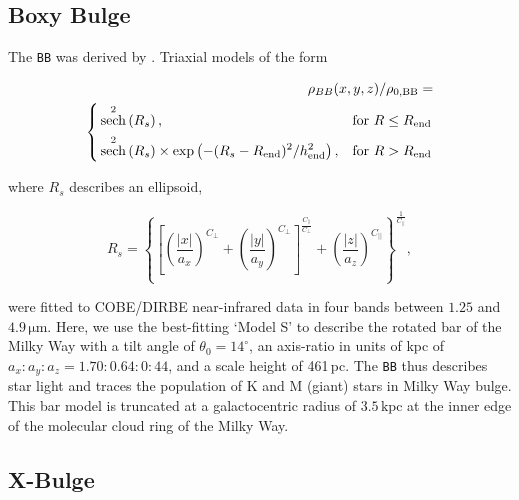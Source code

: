 \documentclass[doublespace,draft,nopageskip]{VTthesis} %
\newcommand{\mrm}[1]{\mathrm{#1}}
\DeclareMathOperator\sech{sech}
\begin{document}
\begin{appendices}
	
	\subsection{Boxy Bulge}
	
	The \texttt{BB} was derived by \citet{Freudenreich1998_BoxyBulge_COBE}.
	Triaxial models of the form
	
	\begin{eqnarray}
		\rho_{BB}(x,y,z)/\rho_{0,\rm BB} = & \\\nonumber \left \{
		\begin{aligned}
			&\sech^2\left(R_s\right), && \text{for}\ R \leq R_{\rm end} \\
			&\sech^2\left(R_s\right) \times \exp\left(-(R_s-R_{\rm end})^2/h_{\rm end}^2\right), && \text{for}\ R > R_{\rm end} \\
		\end{aligned} \right. &
		\label{eq:BB_formula}
	\end{eqnarray} 
	
	\noindent where $R_s$ describes an ellipsoid,
	
	\begin{equation}
		R_s = \left\{ \left[ \left(\frac{|x|}{a_x}\right)^{C_{\bot}} + \left(\frac{|y|}{a_y}\right)^{C_{\bot}} \right]^{\frac{C_{||}}{C_{\bot}}} + \left(\frac{|z|}{a_z}\right)^{C_{||}} \right\}^{\frac{1}{C_{||}}}\mrm{,}
	\end{equation}
	
	\noindent were fitted to COBE/DIRBE near-infrared data in four bands between $1.25$ and $4.9\,\mrm{\mu m}$.
	Here, we use the best-fitting `Model S' to describe the rotated bar of the Milky Way with a tilt angle of $\theta_0 = 14^{\circ}$, an axis-ratio in units of kpc of $a_x : a_y : a_z = 1.70 : 0.64 : 0:44$, and a scale height of 461\,pc.
	The \texttt{BB} thus describes star light and traces the population of K and M (giant) stars in Milky Way bulge.
	This bar model is truncated at a galactocentric radius of $3.5\,\mrm{kpc}$ at the inner edge of the molecular cloud ring of the Milky Way. 
	
	
	\subsection{X-Bulge}
	

\end{appendices}
\end{document}

